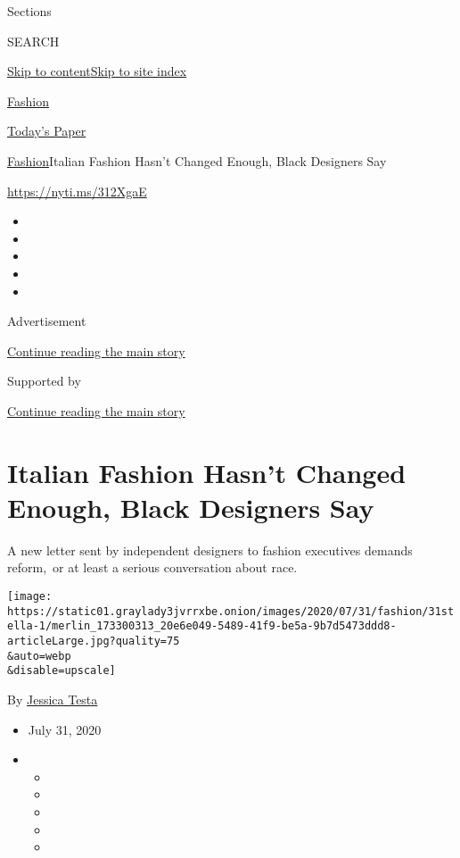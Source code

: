 Sections

SEARCH

\protect\hyperlink{site-content}{Skip to
content}\protect\hyperlink{site-index}{Skip to site index}

\href{https://www.nytimes3xbfgragh.onion/section/fashion}{Fashion}

\href{https://myaccount.nytimes3xbfgragh.onion/auth/login?response_type=cookie\&client_id=vi}{}

\href{https://www.nytimes3xbfgragh.onion/section/todayspaper}{Today's
Paper}

\href{/section/fashion}{Fashion}\textbar{}Italian Fashion Hasn't Changed
Enough, Black Designers Say

\url{https://nyti.ms/312XgaE}

\begin{itemize}
\item
\item
\item
\item
\item
\end{itemize}

Advertisement

\protect\hyperlink{after-top}{Continue reading the main story}

Supported by

\protect\hyperlink{after-sponsor}{Continue reading the main story}

\hypertarget{italian-fashion-hasnt-changed-enough-black-designers-say}{%
\section{Italian Fashion Hasn't Changed Enough, Black Designers
Say}\label{italian-fashion-hasnt-changed-enough-black-designers-say}}

A new letter sent by independent designers to fashion executives demands
reform,~or at least a serious conversation about race.

\texttt{[image: https://static01.graylady3jvrrxbe.onion/images/2020/07/31/fashion/31stella-1/merlin\_173300313\_20e6e049-5489-41f9-be5a-9b7d5473ddd8-articleLarge.jpg?quality=75\\\&auto=webp\\\&disable=upscale]}

By \href{https://www.nytimes3xbfgragh.onion/by/jessica-testa}{Jessica
Testa}

\begin{itemize}
\item
  July 31, 2020
\item
  \begin{itemize}
  \item
  \item
  \item
  \item
  \item
  \end{itemize}
\end{itemize}

